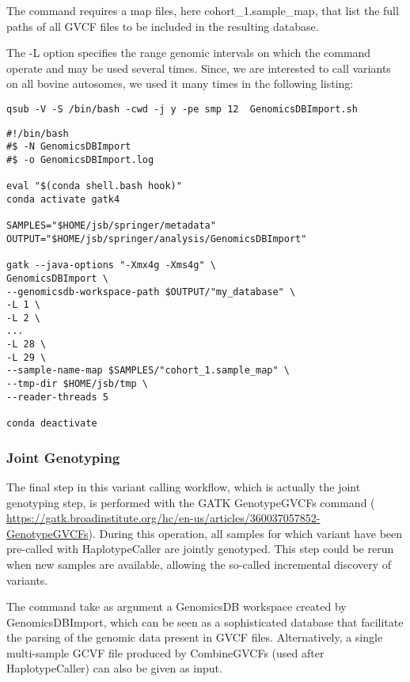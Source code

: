 The command requires a map files, here cohort\_1.sample\_map, that list the full paths of all GVCF files to be included in the resulting database. 

The -L option specifies the range genomic intervals on which the command operate and may be used several times. Since, we are interested to call variants on all bovine autosomes, we used it many times in the following listing:

\begin{verbatim}
qsub -V -S /bin/bash -cwd -j y -pe smp 12  GenomicsDBImport.sh
\end{verbatim}

\begin{verbatim}
#!/bin/bash
#$ -N GenomicsDBImport
#$ -o GenomicsDBImport.log	
	
eval "$(conda shell.bash hook)"
conda activate gatk4

SAMPLES="$HOME/jsb/springer/metadata"
OUTPUT="$HOME/jsb/springer/analysis/GenomicsDBImport"

gatk --java-options "-Xmx4g -Xms4g" \
GenomicsDBImport \
--genomicsdb-workspace-path $OUTPUT/"my_database" \
-L 1 \
-L 2 \
...
-L 28 \
-L 29 \
--sample-name-map $SAMPLES/"cohort_1.sample_map" \
--tmp-dir $HOME/jsb/tmp \
--reader-threads 5

conda deactivate

\end{verbatim}


\subsubsection{Joint Genotyping}

The final step in this variant calling workflow, which is actually the joint genotyping step, is performed with the GATK GenotypeGVCFs command (  \href{https://gatk.broadinstitute.org/hc/en-us/articles/360037057852-GenotypeGVCFs}{https://gatk.broadinstitute.org/hc/en-us/articles/360037057852-GenotypeGVCFs}). During this operation, all samples for which variant have been pre-called with HaplotypeCaller are jointly genotyped. This step could be rerun when new samples are available, allowing the so-called incremental discovery of variants.


The command take as argument a GenomicsDB workspace created by GenomicsDBImport, which can be seen as a sophisticated database that facilitate the parsing of the genomic data present in GVCF files. Alternatively, a single multi-sample GCVF file produced by CombineGVCFs (used after HaplotypeCaller) can also be given as input.

